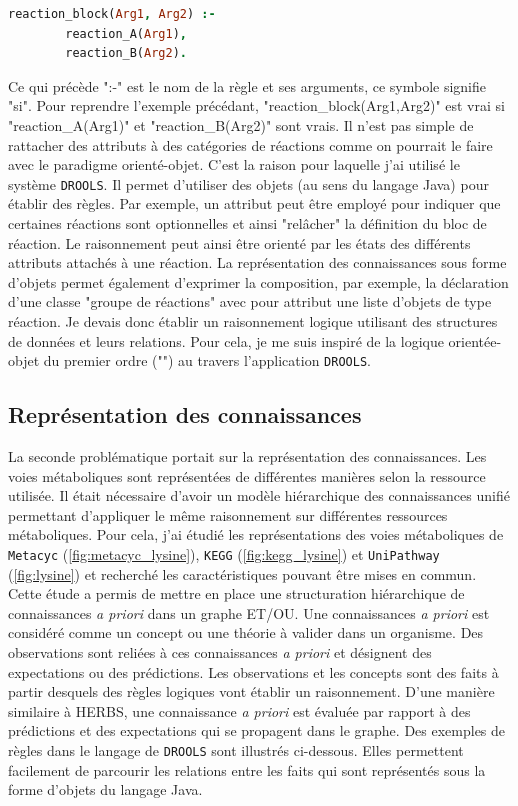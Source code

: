 \begin{refsegment}
\begin{lstlisting}[basicstyle=\small\normalfont\ttfamily,language=Prolog]
    reaction_block(Arg1, Arg2) :-
        reaction_A(Arg1),
        reaction_B(Arg2).
\end{lstlisting}

Ce qui précède  ":-" est le nom de la règle et ses arguments, ce symbole signifie "si". Pour reprendre l'exemple précédant, "reaction\_block(Arg1,Arg2)" est vrai si "reaction\_A(Arg1)" et "reaction\_B(Arg2)" sont vrais. Il n'est pas simple de rattacher des attributs à des catégories de réactions comme on pourrait le faire avec le paradigme orienté-objet. C'est la raison pour laquelle j'ai utilisé le système \texttt{DROOLS}. Il permet d'utiliser des objets (au sens du langage Java) pour établir des règles. Par exemple, un attribut peut être employé pour indiquer que certaines réactions sont optionnelles et ainsi "relâcher" la définition du bloc de réaction. Le raisonnement peut ainsi être orienté par les états des différents attributs attachés à une réaction. La représentation des connaissances sous forme d'objets permet également d'exprimer la composition, par exemple, la déclaration d'une classe "groupe de réactions" avec pour attribut une liste d'objets de type réaction. Je devais donc établir un raisonnement logique utilisant des structures de données et leurs relations. Pour cela, je me suis inspiré de la logique orientée-objet du premier ordre ("") \cite{amir1999object} au travers l'application \texttt{DROOLS}.

\subsection{Représentation des connaissances}

La seconde problématique portait sur la représentation des connaissances. Les voies métaboliques sont représentées de différentes manières selon la ressource utilisée. Il était nécessaire d'avoir un modèle hiérarchique des connaissances unifié permettant d'appliquer le même raisonnement sur différentes ressources métaboliques. Pour cela, j'ai étudié les représentations des voies métaboliques de \texttt{Metacyc} (\cref{fig:metacyc_lysine}), \texttt{KEGG} (\cref{fig:kegg_lysine}) et \texttt{UniPathway} (\cref{fig:lysine}) et recherché les caractéristiques pouvant être mises en commun. Cette étude a permis de mettre en place une structuration hiérarchique de connaissances \textit{a priori} dans un graphe ET/OU. Une connaissances \textit{a priori} est considéré comme un concept ou une théorie à valider dans un organisme. Des observations sont reliées à ces connaissances \textit{a priori} et désignent des expectations ou des prédictions. Les observations et les concepts sont des faits à partir desquels des règles logiques vont établir un raisonnement. D'une manière similaire à HERBS, une connaissance \textit{a priori} est évaluée par rapport à des prédictions et des expectations qui se propagent dans le graphe. Des exemples de règles dans le langage de \texttt{DROOLS} sont illustrés ci-dessous. Elles permettent facilement de parcourir les relations entre les faits qui sont représentés sous la forme d'objets du langage Java.


\end{refsegment}
